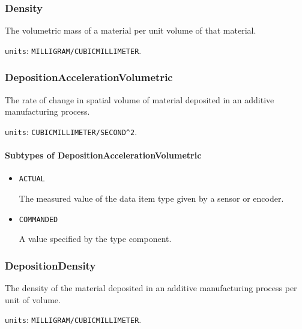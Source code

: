 \subsubsection{Density}
\label{sec:Density}



The volumetric mass of a material per unit volume of that material.


\texttt{units}: \texttt{MILLIGRAM/CUBIC\textunderscore MILLIMETER}.


\subsubsection{DepositionAccelerationVolumetric}
\label{sec:DepositionAccelerationVolumetric}



The rate of change in spatial volume of material deposited in an additive manufacturing process.


\texttt{units}: \texttt{CUBIC\textunderscore MILLIMETER/SECOND\^{}2}.

\paragraph{Subtypes of DepositionAccelerationVolumetric}\mbox{}
\label{sec:Subtypes of DepositionAccelerationVolumetric}

\begin{itemize}

\item \texttt{ACTUAL}


The measured value of the data item type given by a sensor or encoder.

\item \texttt{COMMANDED}


A value specified by the  type component.


\end{itemize}





\subsubsection{DepositionDensity}
\label{sec:DepositionDensity}



The density of the material deposited in an additive manufacturing process per unit of volume.


\texttt{units}: \texttt{MILLIGRAM/CUBIC\textunderscore MILLIMETER}.

